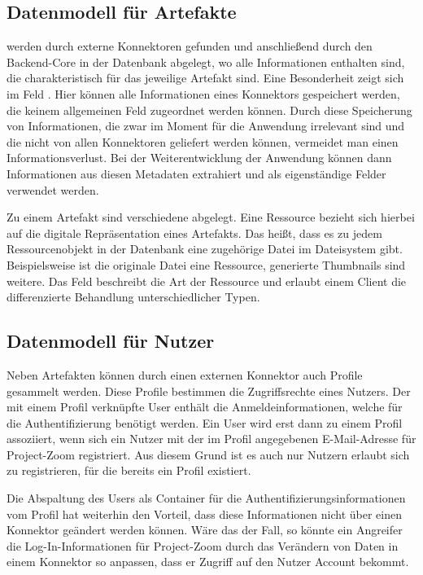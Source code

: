 \subsection{Datenmodell für Artefakte}

 werden durch externe Konnektoren gefunden und anschließend durch den Backend-Core in der Datenbank abgelegt, wo alle Informationen enthalten sind, die charakteristisch für das jeweilige Artefakt sind. Eine Besonderheit zeigt sich im Feld . Hier können alle Informationen eines Konnektors gespeichert werden, die keinem allgemeinen Feld zugeordnet werden können. Durch diese Speicherung von Informationen, die zwar im Moment für die Anwendung irrelevant sind und die nicht von allen Konnektoren geliefert werden können, vermeidet man einen Informationsverlust. Bei der Weiterentwicklung der Anwendung können dann Informationen aus diesen Metadaten extrahiert und als eigenständige Felder verwendet werden. 

Zu einem Artefakt sind verschiedene  abgelegt. Eine Ressource bezieht sich hierbei auf die digitale Repräsentation eines Artefakts. Das heißt, dass es zu jedem Ressourcenobjekt in der Datenbank eine zugehörige Datei im Dateisystem gibt. Beispielsweise ist die originale Datei eine Ressource, generierte Thumbnails sind weitere. Das Feld  beschreibt die Art der Ressource und erlaubt einem Client die differenzierte Behandlung unterschiedlicher Typen.  

\subsection{Datenmodell für Nutzer}

Neben Artefakten können durch einen externen Konnektor auch Profile gesammelt werden. Diese Profile bestimmen die Zugriffsrechte eines Nutzers. Der mit einem Profil verknüpfte User enthält die Anmeldeinformationen, welche für die Authentifizierung benötigt werden. Ein User wird erst dann zu einem Profil assoziiert, wenn sich ein Nutzer mit der im Profil angegebenen E-Mail-Adresse für Project-Zoom registriert. Aus diesem Grund ist es auch nur Nutzern erlaubt sich zu registrieren, für die bereits ein Profil existiert.

Die Abspaltung des Users als Container für die Authentifizierungsinformationen vom Profil hat weiterhin den Vorteil, dass diese Informationen nicht über einen Konnektor geändert werden können. Wäre das der Fall, so könnte ein Angreifer die Log-In-Informationen für Project-Zoom durch das Verändern von Daten in einem Konnektor so anpassen, dass er Zugriff auf den Nutzer Account bekommt.

